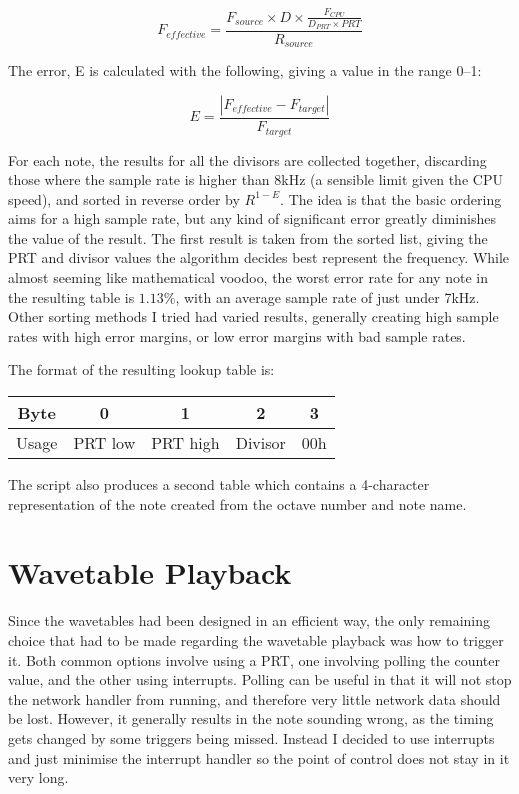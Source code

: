 \[F_{effective} = \frac{F_{source}\times{}D\times{}\frac{F_{CPU}}{D_{PRT}\times{}PRT}}{R_{source}}\]

The error, E is calculated with the following, giving a value in the range 0--1:

\[E = \frac{\left|F_{effective} - F_{target}\right|}{F_{target}}\]

For each note, the results for all the divisors are collected together, discarding those where the 
sample rate is higher than 8kHz (a sensible limit given the CPU speed), and sorted in reverse order 
by $R^{1-E}$.  The idea is that the basic ordering aims for a high sample rate, but any kind of 
significant error greatly diminishes the value of the result.  The first result is taken from the 
sorted list, giving the PRT and divisor values the algorithm decides best represent the frequency.  
While almost seeming like mathematical voodoo, the worst error rate for any note in the resulting 
table is $1.13\%$, with an average sample rate of just under 7kHz.  Other sorting methods I tried 
had varied results, generally creating high sample rates with high error margins, or low error 
margins with bad sample rates.

The format of the resulting lookup table is:
\begin{nowordcount}
\begin{center}
\begin{tabular}{c || c | c | c | c}
Byte & 0 & 1 & 2 & 3 \\
\hline
Usage & PRT low & PRT high & Divisor & 00h \\
\end{tabular}
\end{center}
\end{nowordcount}

The script also produces a second table which contains a 4-character representation of the note 
created from the octave number and note name.

\section{Wavetable Playback}
\label{sec:design:playback}

Since the wavetables had been designed in an efficient way, the only remaining choice that had to be 
made regarding the wavetable playback was how to trigger it.  Both common options involve using a 
PRT, one involving polling the counter value, and the other using interrupts.  Polling can be useful 
in that it will not stop the network handler from running, and therefore very little network data 
should be lost.  However, it generally results in the note sounding wrong, as the timing gets 
changed by some triggers being missed.  Instead I decided to use interrupts and just minimise the 
interrupt handler so the point of control does not stay in it very long.
